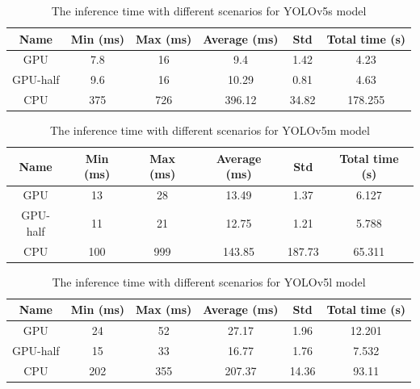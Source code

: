 \documentclass[12pt,a4paper]{article}
\begin{document}
\begin{table}[H]
    \caption{The inference time with different scenarios for YOLOv5s model}
    \label{tab: Data}
    \centering
    \begin{tabular}{c|c|c|c|c|c}
    \toprule
     \textbf{Name} &\bf{Min (ms)}& \bf{Max (ms)} & \textbf{Average (ms)}  & \textbf{Std} & \textbf{Total time (s)} \\
     \midrule
     GPU & 7.8 & 16 & 9.4 & 1.42 & 4.23\\
     GPU-half & 9.6 & 16 & 10.29 & 0.81 & 4.63 \\
     CPU & 375 & 726 & 396.12 & 34.82 & 178.255  \\
     \bottomrule
    \end{tabular}
\end{table}
\begin{table}[H]
    \caption{The inference time with different scenarios for YOLOv5m model}
    \label{tab: Data}
    \centering
    \begin{tabular}{c|c|c|c|c|c}
    \toprule
     \textbf{Name} &\bf{Min (ms)}& \bf{Max (ms)} & \textbf{Average (ms)} & \textbf{Std} & \textbf{Total time (s)} \\
     \midrule
     GPU & 13 & 28 & 13.49 & 1.37 & 6.127\\
     GPU-half & 11 & 21 & 12.75 & 1.21 & 5.788 \\
     CPU & 100 & 999 & 143.85 & 187.73 & 65.311  \\
     \bottomrule
    \end{tabular}
\end{table}

\begin{table}[H]
    \caption{The inference time with different scenarios for YOLOv5l model}
    \label{tab: Data}
    \centering
    \begin{tabular}{c|c|c|c|c|c}
    \toprule
     \textbf{Name} &\bf{Min (ms)}& \bf{Max (ms)} & \textbf{Average (ms)} & \textbf{Std} & \textbf{Total time (s)}  \\
     \midrule
     GPU & 24 & 52 & 27.17 & 1.96 & 12.201\\
     GPU-half & 15 & 33 & 16.77 & 1.76 & 7.532 \\
     CPU & 202 & 355 & 207.37 & 14.36 & 93.11  \\
     \bottomrule
    \end{tabular}
\end{table}
\end{document}
